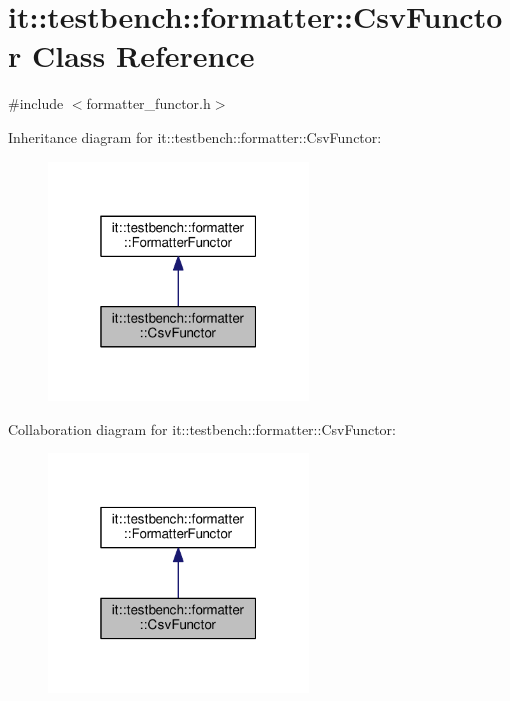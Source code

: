 \hypertarget{classit_1_1testbench_1_1formatter_1_1CsvFunctor}{\section{it\-:\-:testbench\-:\-:formatter\-:\-:Csv\-Functor Class Reference}
\label{d0/d12/classit_1_1testbench_1_1formatter_1_1CsvFunctor}
}


{\ttfamily \#include $<$formatter\-\_\-functor.\-h$>$}



Inheritance diagram for it\-:\-:testbench\-:\-:formatter\-:\-:Csv\-Functor\-:
\nopagebreak
\begin{figure}[H]
\begin{center}
\leavevmode
\includegraphics[width=196pt]{d6/d71/classit_1_1testbench_1_1formatter_1_1CsvFunctor__inherit__graph}
\end{center}
\end{figure}


Collaboration diagram for it\-:\-:testbench\-:\-:formatter\-:\-:Csv\-Functor\-:
\nopagebreak
\begin{figure}[H]
\begin{center}
\leavevmode
\includegraphics[width=196pt]{d9/dec/classit_1_1testbench_1_1formatter_1_1CsvFunctor__coll__graph}
\end{center}
\end{figure}
